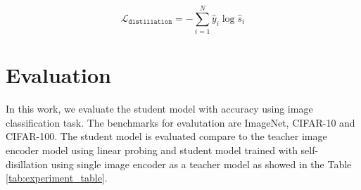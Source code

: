 \begin{equation}
    \label{eq:loss_self_dist}
    \mathcal{L}_{\texttt{distillation}} = -\sum_{i=1}^{N} \hat{y}_i\log\hat{s}_i
\end{equation}



\section{Evaluation}
In this work, we evaluate the student model with accuracy using image classification task.
The benchmarks for evalutation are ImageNet, CIFAR-10 and CIFAR-100.
The student model is evaluated compare to the teacher image encoder model using linear probing and student model trained with self-disillation using single image encoder as a teacher model as showed in the Table \ref{tab:experiment_table}.

